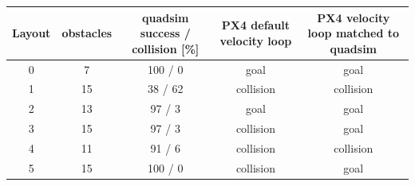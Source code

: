 \begin{tabular}{ccccc}\toprule
Layout & obstacles & quadsim success / collision [\%] & PX4 default velocity loop & PX4 velocity loop matched to quadsim\\\midrule
0 & 7 & 100 / 0 & goal & goal\\
1 & 15 & 38 / 62 & collision & collision\\
2 & 13 & 97 / 3 & goal & goal\\
3 & 15 & 97 / 3 & collision & goal\\
4 & 11 & 91 / 6 & collision & collision\\
5 & 15 & 100 / 0 & collision & goal\\
\bottomrule\end{tabular}
